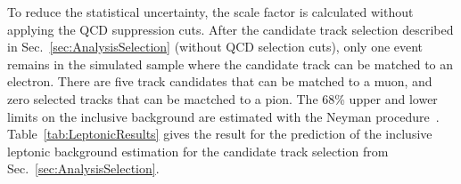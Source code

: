 To reduce the statistical uncertainty, the scale factor is calculated without applying the QCD suppression cuts. 
After the candidate track selection described in Sec.~\ref{sec:AnalysisSelection} (without QCD selection cuts), only one event remains in the simulated \WJets sample where the candidate track can be matched to an electron.
There are five track candidates that can be matched to a muon, and zero selected tracks that can be mactched to a pion.
The 68\% upper and lower limits on the inclusive background are estimated with the Neyman procedure~\cite{bib:PDG_2014}.
Table~\ref{tab:LeptonicResults} gives the result for the prediction of the inclusive leptonic background estimation for the candidate track selection from Sec.~\ref{sec:AnalysisSelection}.

\renewcommand{\arraystretch}{1.4}
\begin{table}[!h]
\centering
\caption{Scaling factor $\rho_{\text{MC}}$, number of events in the control region in data N$_{\text{CR,data}}$ and the resulting inclusive estimation N$_{\text{predicted}}$ after the candidate track selection.}
\label{tab:LeptonicResults}
\vspace{10pt}
\end{table}




